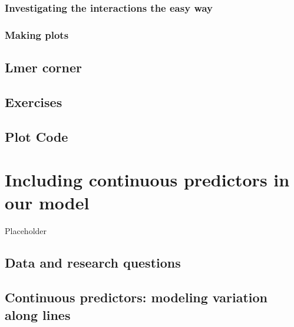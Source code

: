 \documentclass[
]{book}
\begin{document}
\hypertarget{investigating-the-interactions-the-easy-way}{%
\subsection{Investigating the interactions the easy way}\label{investigating-the-interactions-the-easy-way}}

\hypertarget{making-plots}{%
\subsection{Making plots}\label{making-plots}}

\hypertarget{lmer-corner-1}{%
\section{Lmer corner}\label{lmer-corner-1}}

\hypertarget{exercises-3}{%
\section{Exercises}\label{exercises-3}}

\hypertarget{plot-code-3}{%
\section{Plot Code}\label{plot-code-3}}

\hypertarget{including-continuous-predictors-in-our-model}{%
\chapter{Including continuous predictors in our model}\label{including-continuous-predictors-in-our-model}}

Placeholder

\hypertarget{data-and-research-questions-4}{%
\section{Data and research questions}\label{data-and-research-questions-4}}

\hypertarget{continuous-predictors-modeling-variation-along-lines}{%
\section{Continuous predictors: modeling variation along lines}\label{continuous-predictors-modeling-variation-along-lines}}
\end{document}
